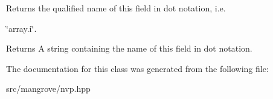 Returns the qualified name of this field in dot notation, i.\+e. 

\char`\"{}array.\+i\char`\"{}. \begin{DoxyReturn}{Returns}
A string containing the name of this field in dot notation. 
\end{DoxyReturn}


The documentation for this class was generated from the following file\+:\begin{DoxyCompactItemize}
\item 
src/mangrove/nvp.\+hpp\end{DoxyCompactItemize}
